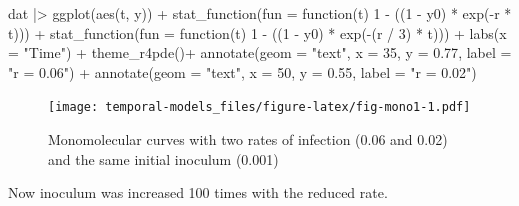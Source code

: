 \documentclass[
  letterpaper,
]{book}
\newenvironment{Shaded}{\begin{snugshade}}{\end{snugshade}}
\newcommand{\AttributeTok}[1]{\textcolor[rgb]{0.40,0.45,0.13}{#1}}
\newcommand{\ControlFlowTok}[1]{\textcolor[rgb]{0.00,0.23,0.31}{#1}}
\newcommand{\DecValTok}[1]{\textcolor[rgb]{0.68,0.00,0.00}{#1}}
\newcommand{\FloatTok}[1]{\textcolor[rgb]{0.68,0.00,0.00}{#1}}
\newcommand{\FunctionTok}[1]{\textcolor[rgb]{0.28,0.35,0.67}{#1}}
\newcommand{\NormalTok}[1]{\textcolor[rgb]{0.00,0.23,0.31}{#1}}
\newcommand{\SpecialCharTok}[1]{\textcolor[rgb]{0.37,0.37,0.37}{#1}}
\newcommand{\StringTok}[1]{\textcolor[rgb]{0.13,0.47,0.30}{#1}}
\begin{document}
\begin{Shaded}
\begin{Highlighting}[]
\NormalTok{dat }\SpecialCharTok{|\textgreater{}}
  \FunctionTok{ggplot}\NormalTok{(}\FunctionTok{aes}\NormalTok{(t, y)) }\SpecialCharTok{+}
  \FunctionTok{stat\_function}\NormalTok{(}\AttributeTok{fun =} \ControlFlowTok{function}\NormalTok{(t) }\DecValTok{1} \SpecialCharTok{{-}}\NormalTok{ ((}\DecValTok{1} \SpecialCharTok{{-}}\NormalTok{ y0) }\SpecialCharTok{*} \FunctionTok{exp}\NormalTok{(}\SpecialCharTok{{-}}\NormalTok{r }\SpecialCharTok{*}\NormalTok{ t))) }\SpecialCharTok{+}
  \FunctionTok{stat\_function}\NormalTok{(}\AttributeTok{fun =} \ControlFlowTok{function}\NormalTok{(t) }\DecValTok{1} \SpecialCharTok{{-}}\NormalTok{ ((}\DecValTok{1} \SpecialCharTok{{-}}\NormalTok{ y0) }\SpecialCharTok{*} \FunctionTok{exp}\NormalTok{(}\SpecialCharTok{{-}}\NormalTok{(r }\SpecialCharTok{/} \DecValTok{3}\NormalTok{) }\SpecialCharTok{*}\NormalTok{ t))) }\SpecialCharTok{+}
  \FunctionTok{labs}\NormalTok{(}\AttributeTok{x =} \StringTok{"Time"}\NormalTok{) }\SpecialCharTok{+}
 \FunctionTok{theme\_r4pde}\NormalTok{()}\SpecialCharTok{+}
  \FunctionTok{annotate}\NormalTok{(}\AttributeTok{geom =} \StringTok{"text"}\NormalTok{, }\AttributeTok{x =} \DecValTok{35}\NormalTok{, }\AttributeTok{y =} \FloatTok{0.77}\NormalTok{, }\AttributeTok{label =} \StringTok{"r = 0.06"}\NormalTok{) }\SpecialCharTok{+}
  \FunctionTok{annotate}\NormalTok{(}\AttributeTok{geom =} \StringTok{"text"}\NormalTok{, }\AttributeTok{x =} \DecValTok{50}\NormalTok{, }\AttributeTok{y =} \FloatTok{0.55}\NormalTok{, }\AttributeTok{label =} \StringTok{"r = 0.02"}\NormalTok{)}
\end{Highlighting}
\end{Shaded}

\begin{figure}

\texttt{[image: temporal-models\_files/figure-latex/fig-mono1-1.pdf]} \hfill{}

\caption{\label{fig-mono1}Monomolecular curves with two rates of
infection (0.06 and 0.02) and the same initial inoculum (0.001)}

\end{figure}

Now inoculum was increased 100 times with the reduced rate.
\end{document}
